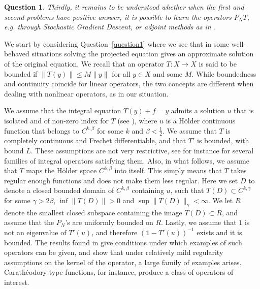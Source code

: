 \documentclass[11pt,fleqn]{amsart} %
\newtheorem{question}[theorem]{Question}
\begin{document}
	\begin{question}\label{question3}
		{\rm 
			Thirdly, it remains to be understood whether when the first and second problems have positive answer, it is possible to learn the operators $P_NT$, e.g. through Stochastic Gradient Descent, or adjoint methods as in \cite{NIDE}. 
		}
	\end{question}
	
	We start by considering Question~\ref{question1} where we see that in some well-behaved situations solving the projected equation gives an approximate solution of the original equation. We recall that an operator $T: X \longrightarrow X$ is said to be bounded if $\|T(y)\| \leq M \|y\|$ for all $y\in X$ and some $M$. While boundedness and continuity coincide for linear operators, the two concepts are different when dealing with nonlinear operators, as in our situation.
	
	We assume that the integral equation $T(y) +f = y$ admits a solution $u$ that is isolated and of non-zero index for $T$ (see \cite{Topological}), where $u$ is a H\"{o}lder continuous function that belongs to $C^{k,\beta}$ for some $k$ and $\beta < \frac{1}{2}$. We assume that $T$ is completely continuous and Frechet differentiable, and that $T'$ is bounded, with bound $L$. These assumptions are not very restrictive, see for instance \cite{Topological} for several families of integral operators satisfying them. Also, in what follows, we assume that $T$ maps the H\"{o}lder space $C^{k,\beta}$ into itself. This simply means that $T$ takes regular enough functions and does not make them less regular. Here we set $D$ to denote a closed bounded domain of $C^{k,\beta}$ containing $u$, such that $T(D) \subset C^{k,\gamma}$ for some $\gamma > 2\beta$, $\inf \|T(D)\| >0$ and $\sup \|T(D)\|_\gamma < \infty$. We let $R$ denote the smallest closed subspace containing the image $T(D) \subset R$, and assume that the $P_N$'s are uniformly bounded on $R$. Lastly, we assume that $1$ is not an eigenvalue of $T'(u)$, and therefore $(\mathbb 1 - T'(u))^{-1}$ exists and it is bounded. The results found in \cite{Pot_Ury,Lanza} give conditions under which examples of such operators can be given, and show that under relatively mild regularity assumptions on the kernel of the operator, a large family of examples arises. Carath\'eodory-type functions, for instance, produce a class of operators of interest.
	
\end{document}
